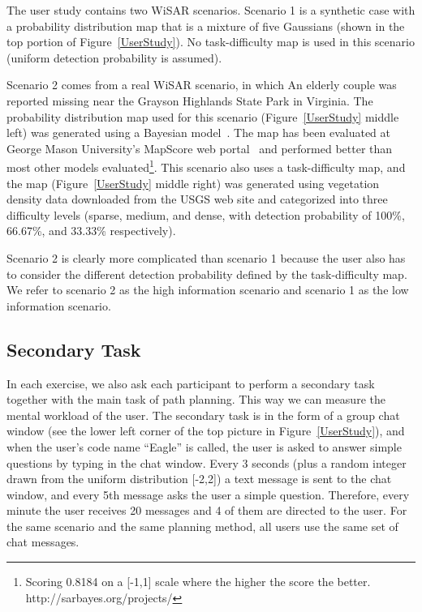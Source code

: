 \documentclass[journal]{IEEEtran}
\begin{document}
The user study contains two WiSAR scenarios. Scenario 1 is a synthetic case with a probability distribution map that is a mixture of five Gaussians (shown in the top portion of Figure~\ref{UserStudy}). No task-difficulty map is used in this scenario (uniform detection probability is assumed). 

Scenario 2 comes from a real WiSAR scenario, in which An elderly couple was reported missing near the Grayson Highlands State Park in Virginia. The probability distribution map used for this scenario (Figure~\ref{UserStudy} middle left) was generated using a Bayesian model~\cite{Lin2010Bayesian}. The map has been evaluated at George Mason University's MapScore web portal~\cite{Twardy2012MapScore} and performed better than most other models evaluated\footnote{Scoring 0.8184 on a [-1,1] scale where the higher the score the better. http://sarbayes.org/projects/}. This scenario also uses a task-difficulty map, and the map (Figure~\ref{UserStudy} middle right) was generated using vegetation density data downloaded from the USGS web site and categorized into three difficulty levels (sparse, medium, and dense, with detection probability of 100\%, 66.67\%, and 33.33\% respectively).

Scenario 2 is clearly more complicated than scenario 1 because the user also has to consider the different detection probability defined by the task-difficulty map. We refer to scenario 2 as the high information scenario and scenario 1 as the low information scenario.

\subsection{Secondary Task}

In each exercise, we also ask each participant to perform a secondary task together with the main task of path planning. This way we can measure the mental workload of the user. The secondary task is in the form of a group chat window (see the lower left corner of the top picture in Figure~\ref{UserStudy}), and when the user's code name ``Eagle'' is called, the user is asked to answer simple questions by typing in the chat window. Every 3 seconds (plus a random integer drawn from the uniform distribution [-2,2]) a text message is sent to the chat window, and every 5th message asks the user a simple question. Therefore, every minute the user receives 20 messages and 4 of them are directed to the user. For the same scenario and the same planning method, all users use the same set of chat messages.
\end{document}
